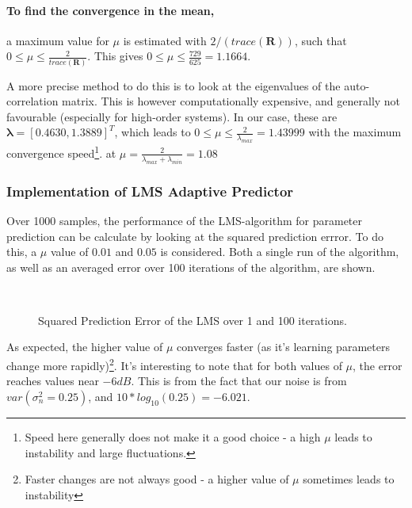 \documentclass[main.tex]{subfiles}
\begin{document}
\paragraph{To find the convergence in the mean,} a maximum value for $\mu$ is estimated with $2/(trace(\textbf{R}))$, such that $0 \leq \mu \leq \frac{2}{trace(\textbf{R})}$. This gives $0 \leq \mu \leq \frac{729}{625} = 1.1664$.

A more precise method to do this is to look at the eigenvalues of the auto-correlation matrix. This is however computationally expensive, and generally not favourable (especially for high-order systems). In our case, these are $\mathbf{ \lambda } = [0.4630, 1.3889] ^ T $, which leads to $0 \leq \mu \leq \frac{2}{\lambda_{max}} = 1.43999$ with the maximum convergence speed\footnote{Speed here generally does not make it a good choice - a high $\mu$ leads to instability and large fluctuations.}.  at $\mu = \frac{2}{\lambda_{max} + \lambda_{min}} = 1.08$






\subsubsection{Implementation of LMS Adaptive Predictor}

Over 1000 samples, the performance of the LMS-algorithm for parameter prediction can be calculate by looking at the squared prediction errror. To do this, a $\mu$ value of $0.01$ and $0.05$ is considered. Both a single run of the algorithm, as well as an averaged error over 100 iterations of the algorithm, are shown.


\begin{figure}[H]
	\centering
	\begin{subfigure}[b]{0.45\textwidth}
		\resizebox{\textwidth}{!}{}
	\end{subfigure}%
	~ %
	\begin{subfigure}[b]{0.45\textwidth}
		\resizebox{\textwidth}{!}{}
	\end{subfigure}
	\caption{Squared Prediction Error of the LMS over 1 and 100 iterations.}
	\label{fig:1-1-b}
\end{figure}



As expected, the higher value of $\mu$ converges faster (as it's learning parameters change more rapidly)\footnote{Faster changes are not always good - a higher value of $\mu$ sometimes leads to instability}. It's interesting to note that for both values of $\mu$, the error reaches values near $-6dB$. This is from the fact that our noise is from $var(\sigma_n^2 = 0.25)$, and $10*log_{10}(0.25) = -6.021$.
\end{document}
